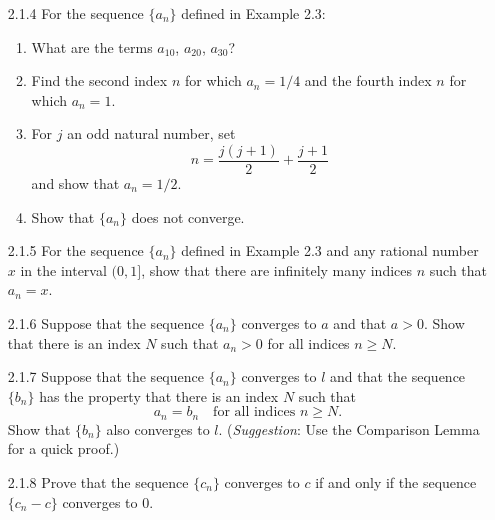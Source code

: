 \begin{enumerate}
\begin{enumerate}
                  \end{enumerate}
   \item[2.1.4]   For the sequence $\{a_n\}$ defined in Example 2.3:
                  \begin{enumerate}
                     \item What are the terms $a_{10}$, $a_{20}$, $a_{30}$?
                     \item Find the second index $n$ for which $a_n = 1/4$ and
                           the fourth index $n$ for which $a_n = 1$.
                     \item For $j$ an odd natural number, set
                           $$n = \frac{j(j+1)}{2} + \frac{j+1}{2}$$
                           and show that $a_n = 1/2$.
                     \item Show that $\{a_n\}$ does not converge.
                  \end{enumerate}
   \item[2.1.5]   For the sequence $\{a_n\}$ defined in Example 2.3 and any
                  rational number $x$ in the interval $(0, 1]$, show that there
                  are infinitely many indices $n$ such that $a_n = x$.
   \item[2.1.6]   Suppose that the sequence $\{a_n\}$ converges to $a$ and that
                  $a > 0$. Show that there is an index $N$ such that $a_n > 0$
                  for all indices $n \ge N$.
   \item[2.1.7]   Suppose that the sequence $\{a_n\}$ converges to $l$ and that
                  the sequence $\{b_n\}$ has the property that there is an index
                  $N$ such that
                  $$a_n = b_n \quad \text{for all indices }n \ge N.$$
                  Show that $\{b_n\}$ also converges to $l$.
                  (\textit{Suggestion}: Use the Comparison Lemma for a quick
                  proof.)
   \item[2.1.8]   Prove that the sequence $\{c_n\}$ converges to $c$ if and only
                  if the sequence $\{c_n - c\}$ converges to 0.

\end{enumerate}

